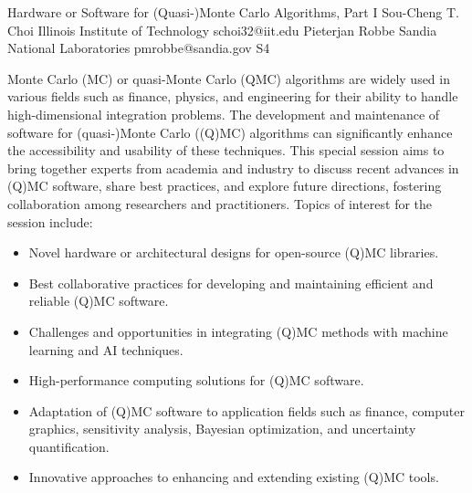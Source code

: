 \documentclass[12pt,lettersize,oneside]{book} %
\begin{document}
\begin{session}
 {Hardware or Software for (Quasi-)Monte Carlo Algorithms, Part I}%
 {Sou-Cheng T. Choi}%
 {Illinois Institute of Technology}%
 {schoi32@iit.edu}%
 {Pieterjan Robbe}%
 {Sandia National Laboratories}%
 {pmrobbe@sandia.gov}%
 {S4}%
 {}%

 Monte Carlo (MC) or quasi-Monte Carlo (QMC) algorithms are widely used in various fields such as finance, physics, and engineering for their ability to handle high-dimensional integration problems. The development and maintenance of software for (quasi-)Monte Carlo ((Q)MC) algorithms can significantly enhance the accessibility and usability of these techniques. This special session aims to bring together experts from academia and industry to discuss recent advances in (Q)MC software, share best practices, and explore future directions, fostering collaboration among researchers and practitioners.
 Topics of interest for the session include:
 \begin{itemize}
 \item Novel hardware or architectural designs for open-source (Q)MC libraries.
 \item Best collaborative practices for developing and maintaining efficient and reliable (Q)MC software.
 \item Challenges and opportunities in integrating (Q)MC methods with machine learning and AI techniques.
 \item High-performance computing solutions for (Q)MC software.
 \item Adaptation of (Q)MC software to application fields such as finance, computer graphics, sensitivity analysis, Bayesian optimization, and uncertainty quantification.
 \item Innovative approaches to enhancing and extending existing (Q)MC tools.
 \end{itemize}
\end{session}


\end{document}
